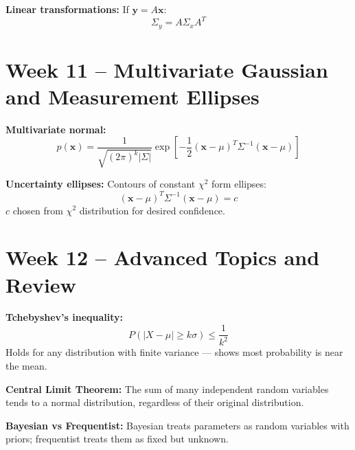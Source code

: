 \documentclass[11pt]{article}
\begin{document}
\textbf{Linear transformations:}
If $\mathbf{y} = A\mathbf{x}$:
\[
    \Sigma_y = A \Sigma_x A^T
\]

\section*{Week 11 – Multivariate Gaussian and Measurement Ellipses}

\textbf{Multivariate normal:}
\[
    p(\mathbf{x}) = \frac{1}{\sqrt{(2\pi)^k |\Sigma|}} \exp\left[ -\frac{1}{2} (\mathbf{x} - \mu)^T \Sigma^{-1} (\mathbf{x} - \mu) \right]
\]

\textbf{Uncertainty ellipses:}
Contours of constant $\chi^2$ form ellipses:
\[
    (\mathbf{x} - \mu)^T \Sigma^{-1} (\mathbf{x} - \mu) = c
\]
$c$ chosen from $\chi^2$ distribution for desired confidence.

\section*{Week 12 – Advanced Topics and Review}

\textbf{Tchebyshev’s inequality:}
\[
    P(|X - \mu| \ge k\sigma) \le \frac{1}{k^2}
\]
Holds for any distribution with finite variance — shows most probability is near the mean.

\textbf{Central Limit Theorem:}
The sum of many independent random variables tends to a normal distribution, regardless of their original distribution.

\textbf{Bayesian vs Frequentist:}
Bayesian treats parameters as random variables with priors; frequentist treats them as fixed but unknown.
\end{document}
